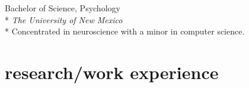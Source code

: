 \documentclass[]{friggeri-cv} %
\begin{document}
\begin{description}
  \item  {\largeheaderfont Bachelor of Science, Psychology } \hfill
    { }\\*
    {\footnotesize \emph{The University of New Mexico  }} \\*
    Concentrated in neuroscience with a minor in computer science.
\end{description}

\section{research/work experience}
\end{document}
